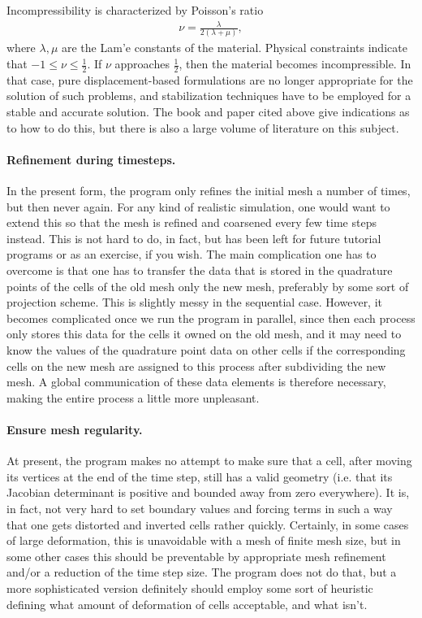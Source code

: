 \documentclass{article}
\begin{document}
Incompressibility is characterized by Poisson's ratio
\begin{gather*}
  \nu = \frac{\lambda}{2(\lambda+\mu)},
\end{gather*}
where $\lambda,\mu$ are the Lam'e constants of the material.
Physical constraints indicate that $-1\le \nu\le \tfrac 12$. If $\nu$
approaches $\tfrac 12$, then the material becomes incompressible. In that
case, pure displacement-based formulations are no longer appropriate for the
solution of such problems, and stabilization techniques have to be employed
for a stable and accurate solution. The book and paper cited above give
indications as to how to do this, but there is also a large volume of
literature on this subject.


\paragraph*{Refinement during timesteps.} In the present form, the program
only refines the initial mesh a number of times, but then never again. For any
kind of realistic simulation, one would want to extend this so that the mesh
is refined and coarsened every few time steps instead. This is not hard to do,
in fact, but has been left for future tutorial programs or as an exercise, if
you wish. The main complication one has to overcome is that one has to
transfer the data that is stored in the quadrature points of the cells of the
old mesh only the new mesh, preferably by some sort of projection scheme. This
is slightly messy in the sequential case. However, it becomes complicated once
we run the program in parallel, since then each process only stores this data
for the cells it owned on the old mesh, and it may need to know the values of
the quadrature point data on other cells if the corresponding cells on the new
mesh are assigned to this process after subdividing the new mesh. A global
communication of these data elements is therefore necessary, making the entire
process a little more unpleasant.


\paragraph*{Ensure mesh regularity.} At present, the program makes no attempt
to make sure that a cell, after moving its vertices at the end of the time
step, still has a valid geometry (i.e. that its Jacobian determinant is
positive and bounded away from zero everywhere). It is, in fact, not very hard
to set boundary values and forcing terms in such a way that one gets distorted
and inverted cells rather quickly. Certainly, in some cases of large
deformation, this is unavoidable with a mesh of finite mesh size, but in some
other cases this should be preventable by appropriate mesh refinement and/or a
reduction of the time step size. The program does not do that, but a more
sophisticated version definitely should employ some sort of heuristic defining
what amount of deformation of cells acceptable, and what isn't.
\end{document}
